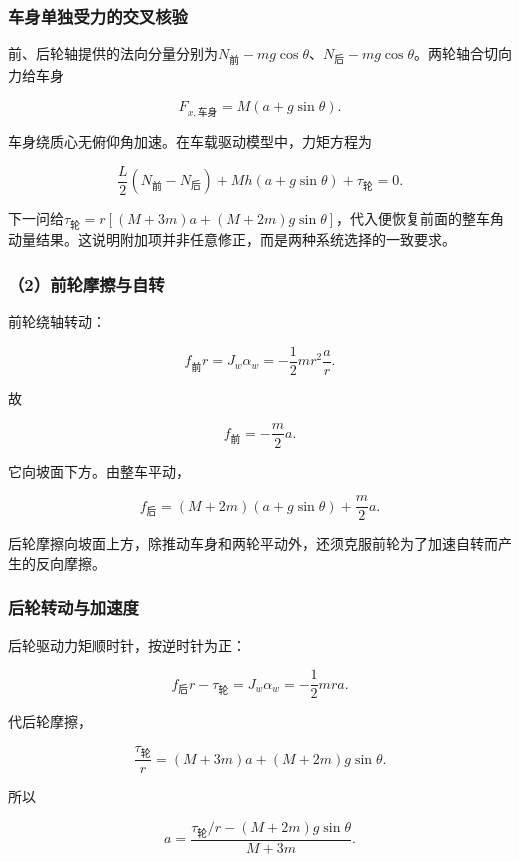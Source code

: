 \documentclass[12pt,a4paper,fontset=fandol]{ctexart}
\begin{document}
\subsubsection{车身单独受力的交叉核验}\label{ux8f66ux8eabux5355ux72ecux53d7ux529bux7684ux4ea4ux53c9ux6838ux9a8c}

前、后轮轴提供的法向分量分别为\(N_{\text{前}}-mg\cos\theta\)、\(N_{\text{后}}-mg\cos\theta\)。两轮轴合切向力给车身

\[
F_{x,\text{车身}}=M(a+g\sin\theta).
\]

车身绕质心无俯仰角加速。在车载驱动模型中，力矩方程为

\[
\frac L2(N_{\text{前}}-N_{\text{后}})
+Mh(a+g\sin\theta)+\tau_{\text{轮}}=0.
\]

下一问给\(\tau_{\text{轮}}=r[(M+3m)a+(M+2m)g\sin\theta]\)，代入便恢复前面的整车角动量结果。这说明附加项并非任意修正，而是两种系统选择的一致要求。

\subsubsection{（2）前轮摩擦与自转}\label{ux524dux8f6eux6469ux64e6ux4e0eux81eaux8f6c}

前轮绕轴转动：

\[
f_{\text{前}}r=J_w\alpha_w
=-\frac12mr^2\frac ar.
\]

故

\[
\boxed{f_{\text{前}}=-\frac m2a}.
\]

它向坡面下方。由整车平动，

\[
\boxed{
f_{\text{后}}=(M+2m)(a+g\sin\theta)+\frac m2a}.
\]

后轮摩擦向坡面上方，除推动车身和两轮平动外，还须克服前轮为了加速自转而产生的反向摩擦。

\subsubsection{后轮转动与加速度}\label{ux540eux8f6eux8f6cux52a8ux4e0eux52a0ux901fux5ea6}

后轮驱动力矩顺时针，按逆时针为正：

\[
f_{\text{后}}r-\tau_{\text{轮}}
=J_w\alpha_w=-\frac12mra.
\]

代后轮摩擦，

\[
\frac{\tau_{\text{轮}}}r=(M+3m)a+(M+2m)g\sin\theta.
\]

所以

\[
\boxed{
a=\frac{\tau_{\text{轮}}/r-(M+2m)g\sin\theta}
{M+3m}}.
\]
\end{document}
